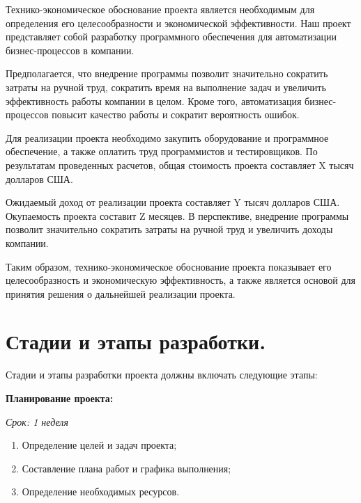 Технико-экономическое обоснование проекта является необходимым для определения его целесообразности и экономической эффективности. Наш проект представляет собой разработку программного обеспечения для автоматизации бизнес-процессов в компании.

Предполагается, что внедрение программы позволит значительно сократить затраты на ручной труд, сократить время на выполнение задач и увеличить эффективность работы компании в целом. Кроме того, автоматизация бизнес-процессов повысит качество работы и сократит вероятность ошибок.

Для реализации проекта необходимо закупить оборудование и программное обеспечение, а также оплатить труд программистов и тестировщиков. По результатам проведенных расчетов, общая стоимость проекта составляет X тысяч долларов США.

Ожидаемый доход от реализации проекта составляет Y тысяч долларов США. Окупаемость проекта составит Z месяцев. В перспективе, внедрение программы позволит значительно сократить затраты на ручной труд и увеличить доходы компании.

Таким образом, технико-экономическое обоснование проекта показывает его целесообразность и экономическую эффективность, а также является основой для принятия решения о дальнейшей реализации проекта.







\section{Стадии и этапы разработки.}






Стадии и этапы разработки проекта должны включать следующие этапы:

    \textbf{Планирование проекта:}
    
    \textit{Срок: 1 неделя}

    \begin{enumerate}

    \item    Определение целей и задач проекта;
    \item    Составление плана работ и графика выполнения;
    \item    Определение необходимых ресурсов.

    \end{enumerate}
    

